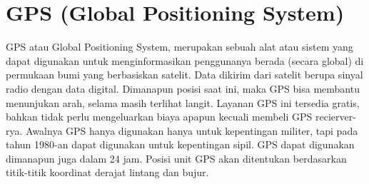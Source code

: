 \section{GPS (Global Positioning System)}
GPS atau Global Positioning System, merupakan sebuah alat atau sistem yang dapat digunakan untuk menginformasikan penggunanya berada (secara global) di permukaan bumi yang berbasiskan satelit. Data dikirim dari satelit berupa sinyal radio dengan data digital. Dimanapun posisi saat ini, maka GPS bisa membantu menunjukan arah, selama masih terlihat langit. Layanan GPS ini tersedia gratis, bahkan tidak perlu mengeluarkan biaya apapun kecuali membeli GPS recierver-rya.
Awalnya GPS hanya digunakan hanya untuk kepentingan militer, tapi pada tahun 1980-an dapat digunakan untuk kepentingan sipil. GPS dapat digunakan dimanapun juga dalam 24 jam. Posisi unit GPS akan ditentukan berdasarkan titik-titik koordinat derajat lintang dan bujur.

